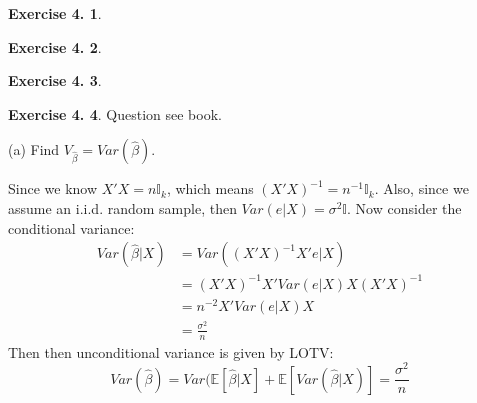 \documentclass[12pt,letterpaper,reqno]{amsart}
\newcommand{\E}{\mathbb E}
\newcommand{\I}{\mathbb I}
\theoremstyle{plain}
\theoremstyle{definition}
\theoremstyle{definition}
\newtheorem{Exercise}{Exercise 4.}
\numberwithin{equation}{section}
\begin{document}
\begin{Exercise}
\end{Exercise}

\begin{Exercise}
\end{Exercise}

\begin{Exercise} 
\end{Exercise}

\begin{Exercise} Question see book.

    (a) Find $V_{\hat{\beta}} = Var(\widehat{\beta})$.

    Since we know $X'X=n\I_k$, which means $(X'X)^{-1} = n^{-1} \I_k$. Also, since we assume an i.i.d. random sample, then $Var(e|X) = \sigma^2 \I $. Now consider the conditional variance:
    \[\begin{split}
        Var(\widehat{\beta} |X) & = Var( (X'X)^{-1}X'e |X) \\
        & = (X'X)^{-1}X' Var(e|X) X(X'X)^{-1} \\
        & = n^{-2} X' Var(e|X) X \\
        & = \frac{\sigma^2}{n}
    \end{split}\]
    Then then unconditional variance is given by LOTV:
    \[
        Var(\widehat{\beta}) = Var(\E[\widehat{\beta}|X] + \E[Var(\widehat{\beta}|X)] = \frac{\sigma^2}{n}
    \]
\end{Exercise}
\end{document}
